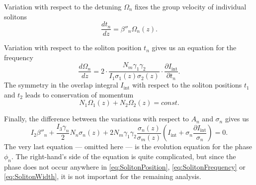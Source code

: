 \documentclass[a4paper, 11pt]{article}
\begin{document}
Variation with respect to the detuning $\Omega_{n}$ fixes the group velocity of individual solitons
\begin{equation}
  \label{eq:SolitonPosition}
  \frac{d t_{n}}{dz} = \beta''_{n} \Omega_{n}(z).
\end{equation}

Variation with respect to the soliton position $t_{n}$ gives us an equation for the frequency
\begin{equation}
  \label{eq:SolitonFrequency}
  \frac{d \Omega_{n}}{dz} =
    2 \cdot \frac{N_{m} \gamma_{1} \gamma_{2}}
           {I_{1} \sigma_{1}(z) \sigma_{2}(z)} \cdot
    \frac{\partial I_{\text{int}}}{\partial t_{n}}.
\end{equation}
The symmetry in the overlap integral $I_{\text{int}}$ with respect to the soliton positions $t_{1}$ and $t_{2}$ leads to conservation of momentum
\begin{equation}
  \label{eq:ConservationOfMomentum}
  N_{1} \Omega_{1}(z) + N_{2} \Omega_{2}(z) = const.
\end{equation}

Finally, the difference between the variations with respect to $A_{n}$ and $\sigma_{n}$ gives us
\begin{equation}
  \label{eq:SolitonWidth}
  I_{2} \beta''_{n} +
  \frac{I_{3} \gamma_{n}}{2} N_{n} \sigma_{n}(z)
  + 2 N_{m} \gamma_{1} \gamma_{2} \frac{\sigma_{n}(z)}{\sigma_{m}(z)} \left(
    I_{\text{int}} + \sigma_{n} \frac{\partial I_{\text{int}}}{\sigma_{n}}
  \right) = 0.
\end{equation}
The very last equation --- omitted here --- is the evolution equation for the phase $\phi_{n}$. The right-hand's side of the equation is quite complicated, but since the phase does not occur anywhere in \eqref{eq:SolitonPosition}, \eqref{eq:SolitonFrequency} or \eqref{eq:SolitonWidth}, it is not important for the remaining analysis.
\end{document}
